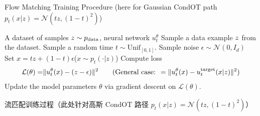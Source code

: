 \begin{algorithm}[h]
\caption{Flow Matching Training Procedure (here for Gaussian CondOT path $p_t(x|z)=\mathcal{N}(tz,(1-t)^2)$)}
\label{alg:training_fm_score_matching_gaussian_paths}
\begin{algorithmic}[1]
\REQUIRE A dataset of samples $z\sim p_{\rm{data}}$, neural network $u_t^\theta$
    \STATE Sample a data example $z$ from the dataset.
    \STATE Sample a random time $t \sim \text{Unif}_{[0,1]}$.
    \STATE Sample noise $\epsilon\sim\mathcal{N}(0,I_d)$
    \STATE Set $x=t z + (1-t) \epsilon$\hfill ($x\sim p_t(\cdot|z)$)
    \STATE Compute loss
    \begin{align*}
        \mathcal{L}(\theta) =& \|u_t^\theta(x)-(z-\epsilon)\|^2 \quad &(\text{General case: }=\|u_t^\theta(x)-u^{\text{target}}_t(x|z)\|^2)
    \end{align*}
    \STATE Update the model parameters $\theta$ via gradient descent on $\mathcal{L}(\theta)$.
\ENDFOR
\end{algorithmic}
\end{algorithm}

流匹配训练过程（此处针对高斯 CondOT 路径 $p_t(x|z)=\mathcal{N}(tz,(1-t)^2)$）

